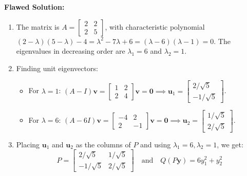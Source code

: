 \documentclass[11pt, letterpaper]{article}
\theoremstyle{definition}
\theoremstyle{remark}
\begin{document}
\textbf{Flawed Solution:}
\begin{enumerate}
    \item The matrix is $A = \begin{bmatrix} 2 & 2 \\ 2 & 5 \end{bmatrix}$, with characteristic polynomial $(2-\lambda)(5-\lambda) - 4 = \lambda^2 - 7\lambda + 6 = (\lambda - 6)(\lambda - 1) = 0$. The eigenvalues in decreasing order are $\lambda_1 = 6$ and $\lambda_2 = 1$.
    \item Finding unit eigenvectors:
    \begin{itemize}
        \item For $\lambda = 1$: $(A - I)\mathbf{v} = \begin{bmatrix} 1 & 2 \\ 2 & 4 \end{bmatrix}\mathbf{v} = \mathbf{0} \implies \mathbf{u}_1 = \begin{bmatrix} 2/\sqrt{5} \\ -1/\sqrt{5} \end{bmatrix}$.
        \item For $\lambda = 6$: $(A - 6I)\mathbf{v} = \begin{bmatrix} -4 & 2 \\ 2 & -1 \end{bmatrix}\mathbf{v} = \mathbf{0} \implies \mathbf{u}_2 = \begin{bmatrix} 1/\sqrt{5} \\ 2/\sqrt{5} \end{bmatrix}$.
    \end{itemize}
    \item Placing $\mathbf{u}_1$ and $\mathbf{u}_2$ as the columns of $P$ and using $\lambda_1 = 6, \lambda_2 = 1$, we get:
    \[
    P = \begin{bmatrix} 2/\sqrt{5} & 1/\sqrt{5} \\ -1/\sqrt{5} & 2/\sqrt{5} \end{bmatrix} \quad \text{and} \quad Q(P\mathbf{y}) = 6y_1^2 + y_2^2
    \]
\end{enumerate}
\end{document}
